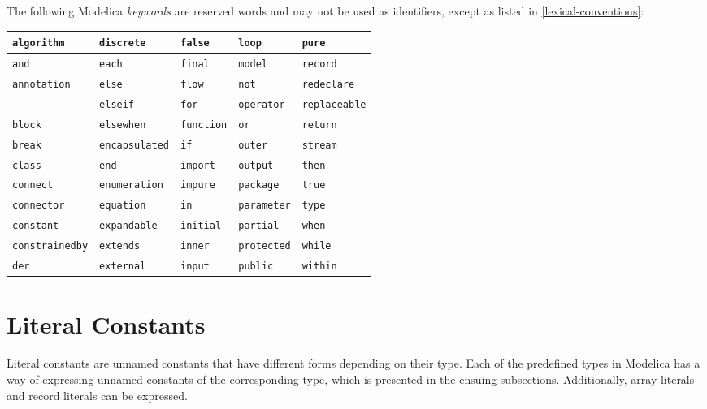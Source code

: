 The following Modelica \emph{keywords} are reserved words and may not be
used as identifiers, except as listed in \cref{lexical-conventions}:
\begin{longtable}[c]{@{}lllll@{}}
\lstinline!algorithm! & \lstinline!discrete! & \lstinline!false! & \lstinline!loop! & \lstinline!pure!\\ \hline
\lstinline!and! & \lstinline!each! & \lstinline!final! & \lstinline!model! & \lstinline!record!\\ \hline
\lstinline!annotation! & \lstinline!else! & \lstinline!flow! & \lstinline!not! & \lstinline!redeclare!\\ \hline
& \lstinline!elseif! & \lstinline!for! & \lstinline!operator! & \lstinline!replaceable!\\ \hline
\lstinline!block! & \lstinline!elsewhen! & \lstinline!function! & \lstinline!or! & \lstinline!return!\\ \hline
\lstinline!break! & \lstinline!encapsulated! & \lstinline!if! & \lstinline!outer! & \lstinline!stream!\\ \hline
\lstinline!class! & \lstinline!end! & \lstinline!import! & \lstinline!output! & \lstinline!then!\\ \hline
\lstinline!connect! & \lstinline!enumeration! & \lstinline!impure! & \lstinline!package! & \lstinline!true!\\ \hline
\lstinline!connector! & \lstinline!equation! & \lstinline!in! & \lstinline!parameter! & \lstinline!type!\\ \hline
\lstinline!constant! & \lstinline!expandable! & \lstinline!initial! & \lstinline!partial! & \lstinline!when!\\ \hline
\lstinline!constrainedby! & \lstinline!extends! & \lstinline!inner! & \lstinline!protected! & \lstinline!while!\\ \hline
\lstinline!der! & \lstinline!external! & \lstinline!input! & \lstinline!public! & \lstinline!within!\\ \hline
\end{longtable}

\section{Literal Constants}\label{literal-constants}

Literal constants are unnamed constants that have different forms
depending on their type. Each of the predefined types in Modelica has a
way of expressing unnamed constants of the corresponding type, which is
presented in the ensuing subsections. Additionally, array literals and
record literals can be expressed.

